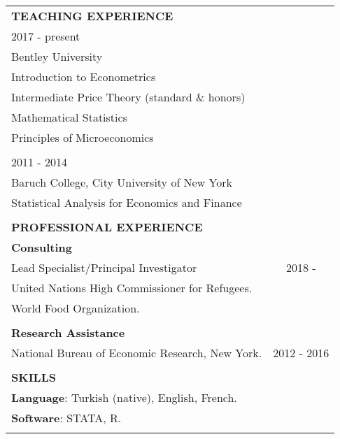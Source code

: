 \documentclass[12 pt]{article}
\begin{document}
\begin{longtable}{ccccc}
\\


 \multicolumn{5}{l}{\textbf{TEACHING EXPERIENCE}}\\[2 pt] 
  \multicolumn{4}{l}{2017 - present} \\
\multicolumn{4}{l}{Bentley University}   \\
 \multicolumn{4}{l}{Introduction to Econometrics}      \\
  \multicolumn{4}{l}{Intermediate Price Theory (standard \& honors)}    \\
 \multicolumn{4}{l}{Mathematical Statistics}      \\
\multicolumn{4}{l}{Principles of Microeconomics} \\

\\
 \multicolumn{4}{l}{2011 - 2014} \\
\multicolumn{4}{l}{Baruch College, City University of New York}     \\

\multicolumn{4}{l}{Statistical Analysis for Economics and Finance}        \\

\\

\multicolumn{5}{l}{\textbf{PROFESSIONAL EXPERIENCE}}\\[2 pt] 
\multicolumn{4}{l}{\textbf{Consulting}} \\ 
\multicolumn{4}{l}{Lead Specialist/Principal Investigator}  & \multicolumn{1}{c}{2018 - \phantom{2016}}   \\
\multicolumn{4}{l}{United Nations High Commissioner for Refugees.}   \\
\multicolumn{4}{l}{World Food Organization.}   \\

\\
\multicolumn{4}{l}{\textbf{Research Assistance}} \\ 
\multicolumn{4}{l}{National Bureau of Economic Research, New York.} & \multicolumn{1}{c}{2012 - 2016}   \\
\\



\multicolumn{5}{l}{\textbf{SKILLS}}\\[2 pt]

 \multicolumn{4}{l}{\textbf{Language}: Turkish (native), English, French.}      \\
  \multicolumn{4}{l}{\textbf{Software}: STATA, R.}\\
 \\



\end{longtable}
\end{document}
